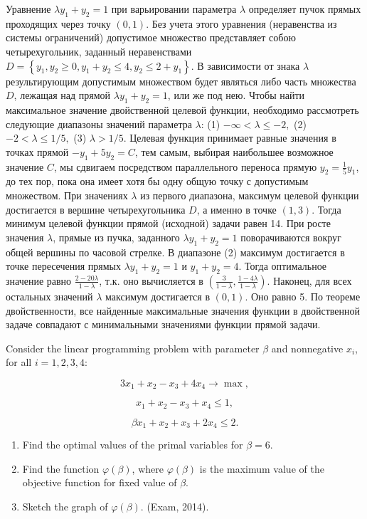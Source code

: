 \begin{solution}
Уравнение $\lambda y_{1} +y_{2} =1$ при варьировании параметра $\lambda $ определяет пучок прямых проходящих через точку $(0,1)$. Без учета этого уравнения (неравенства из системы ограничений) допустимое множество представляет собою четырехугольник, заданный неравенствами $D=\left\{y_{1} ,y_{2} \ge 0,y_{1} +y_{2} \le 4,y_{2} \le 2+y_{1} \right\}$. В зависимости от знака $\lambda $ результирующим допустимым множеством будет являться либо часть множества $D$, лежащая над прямой $\lambda y_{1} +y_{2} =1$, или же под нею. Чтобы найти максимальное значение двойственной целевой функции, необходимо рассмотреть следующие диапазоны значений параметра $\lambda $: (1) $-\infty <\lambda \le -2,$ (2) $-2<\lambda \le 1/5,$ (3) $\lambda >1/5.$ Целевая функция принимает равные значения в точках прямой $-y_{1} +5y_{2} =C$, тем самым, выбирая наибольшее возможное значение $C$, мы сдвигаем посредством параллельного переноса прямую $y_{2} =\frac{1}{5} y_{1} $, до тех пор, пока она имеет хотя бы одну общую точку с допустимым множеством. При значениях $\lambda $ из первого диапазона, максимум целевой функции достигается в вершине четырехугольника $D$, а именно в точке $(1,3)$. Тогда минимум целевой функции прямой (исходной) задачи равен 14. При росте значения $\lambda $, прямые из пучка, заданного $\lambda y_{1} +y_{2} =1$ поворачиваются вокруг общей вершины по часовой стрелке. В диапазоне (2) максимум достигается в точке пересечения прямых $\lambda y_{1} +y_{2} =1$ и $y_{1} +y_{2} =4$. Тогда оптимальное значение  равно $\frac{2-20\lambda }{1-\lambda } $, т.к. оно вычисляется в $(\frac{3}{1-\lambda } ,  \frac{1-4\lambda }{1-\lambda } )$. Наконец, для всех остальных значений $\lambda $ максимум достигается в $(0,1).$ Оно равно 5. По теореме двойственности, все найденные максимальные значения функции в двойственной задаче совпадают с минимальными значениями функции прямой задачи.
\end{solution}

\begin{problem}
Consider the linear programming problem with parameter $\beta $ and nonnegative $x_{i} $, for all $i=1, 2, 3, 4$:

\[3x_{1} +x_{2} -x_{3} +4x_{4} \to \max ,\] 

\[x_{1} +x_{2} -x_{3} +x_{4} \le 1,\] 

\[\beta x_{1} +x_{2} +x_{3} +2x_{4} \le 2.\] 

\begin{enumerate}
\item  Find the optimal values of the primal variables for $\beta =6$.

\item  Find the function $\varphi (\beta )$, where $\varphi (\beta )$ is the maximum value of the objective function for fixed value of $\beta $.

\item  Sketch the graph of $\varphi (\beta )$.  (Exam, 2014).
\end{enumerate}
\end{problem}


